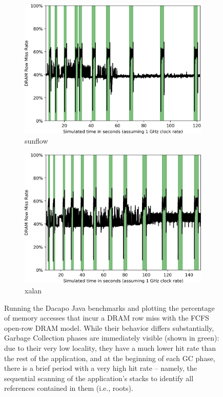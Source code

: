\begin{figure}
\begin{subfigure}[t]{0.23\textwidth}
		\includegraphics[width=\textwidth]{results/rowmisses_sunflow.png}
		\caption{sunflow}
	\end{subfigure}
	\begin{subfigure}[t]{0.23\textwidth}
		\includegraphics[width=\textwidth]{results/rowmisses_xalan.png}
		\caption{xalan}
	\end{subfigure}
	\caption{Running the Dacapo Java benchmarks and plotting the percentage of memory accesses that incur a DRAM row miss with the FCFS open-row DRAM model. While their behavior differs substantially, Garbage Collection phases are immediately visible (shown in green): due to their very low locality, they have a much lower hit rate than the rest of the application, and at the beginning of each GC phase, there is a brief period with a very high hit rate -- namely, the sequential scanning of the application's stacks to identify all references contained in them (i.e., roots).}
	\label{fig:java_rowmisses}
\end{figure}

